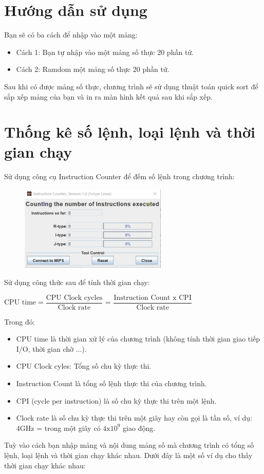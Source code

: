\documentclass[a4paper]{article}
\begin{document}
\section{Hướng dẫn sử dụng}
Bạn sẽ có ba cách để nhập vào một mảng:
\begin{itemize}
	\item Cách 1: Bạn tự nhập vào một mảng số thực 20 phần tử.
	\item Cách 2: Ramdom một mảng số thực 20 phần tử.
\end{itemize}
Sau khi có được mảng số thực, chương trình sẽ sử dụng thuật toán quick sort để sắp xếp mảng của bạn và in ra màn hình kết quả sau khi sắp xếp.
\section{Thống kê số lệnh, loại lệnh và thời gian chạy}
Sử dụng công cụ Instruction Counter để đếm số lệnh trong chương trình:
\begin{center}
	\begin{figure}[h!]
		\begin{center}
			\includegraphics[width=7cm]{Images/IC.png}
		\end{center}
	\end{figure}
\end{center}
Sử dụng công thức sau để tính thời gian chạy:
\begin{center}
	$\text{CPU time} = \dfrac{\text{CPU Clock cycles}}{\text{Clock rate}}$ = $\dfrac{\text{Instruction Count x CPI}}{\text{Clock rate}}$
\end{center}
Trong đó:
\begin{itemize}
	\item CPU time là thời gian xử lý của chương trình (không tính thời gian giao tiếp I/O, thời gian chờ ...).
	\item CPU Clock cyles: Tổng số chu kỳ thực thi.
	\item Instruction Count là tổng số lệnh thực thi của chương trình.
	\item CPI (cycle per instruction) là số chu kỳ thực thi trên một lệnh.
	\item Clock rate là số chu kỳ thực thi trên một giây hay còn gọi là tần số, ví dụ: 4GHz = trong một giây có $4\text{x}10^9$ giao động.
\end{itemize}
Tuỳ vào cách bạn nhập mảng và nội dung mảng số mà chương trình có tổng số lệnh, loại lệnh và thời gian chạy khác nhau. Dưới đây là một số ví dụ cho thấy thời gian chạy khác nhau:
\end{document}
